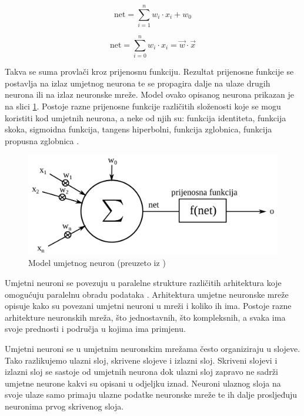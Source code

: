 \documentclass[zavrsnirad]{fer}
\begin{document}
	\begin{equation}
		\label{net}
		\text{net} = \sum_{i=1}^{n} w_i \cdot x_i + w_0
	\end{equation}
	
	\begin{equation}
		\label{konacanNet}
		\text{net} = \sum_{i=0}^{n} w_i \cdot x_i = \vec{w} \cdot \vec{x}
	\end{equation}
	
	Takva se suma provlači kroz prijenosnu funkciju. Rezultat prijenosne funkcije se postavlja na izlaz umjetnog neurona te se propagira dalje na ulaze drugih neurona ili na izlaz neuronske mreže. Model ovako opisanog neurona prikazan je na slici \ref{modelUmjetnogNeurona}. Postoje razne prijenosne funkcije različitih složenosti koje se mogu koristiti kod umjetnih neurona, a neke od njih su: funkcija identiteta, funkcija skoka, sigmoidna funkcija, tangens hiperbolni, funkcija zglobnica, funkcija propusna zglobnica \cite{skriptaNeuronskeMreze}.
	
	\begin{figure}[htb]
		\centering
		\includegraphics[width=\textwidth]{Extra/modelUmjetnogNeurona.png} 
		\caption{Model umjetnog neuron (preuzeto iz \cite{skriptaNeuronskeMreze})}
		\label{modelUmjetnogNeurona}
	\end{figure}
	
	Umjetni neuroni se povezuju u paralelne strukture različitih arhitektura koje omogućuju paralelnu obradu podataka \cite{skriptaNeuronskeMreze}. Arhitektura umjetne neuronske mreže opisuje kako su povezani umjetni neuroni u mreži i koliko ih ima. Postoje razne arhitekture neuronskih mreža, što jednostavnih, što kompleksnih, a svaka ima svoje prednosti i područja u kojima ima primjenu.
	
	Umjetni neuroni se u umjetnim neuronskim mrežama često organiziraju u slojeve. Tako razlikujemo ulazni sloj, skrivene slojeve i izlazni sloj. Skriveni slojevi i izlazni sloj se sastoje od umjetnih neurona dok ulazni sloj zapravo ne sadrži umjetne neurone kakvi su opisani u odjeljku iznad. Neuroni ulaznog sloja na svoje ulaze samo primaju ulazne podatke neuronske mreže te ih dalje prosljeđuju neuronima prvog skrivenog sloja.
	
\end{document}

